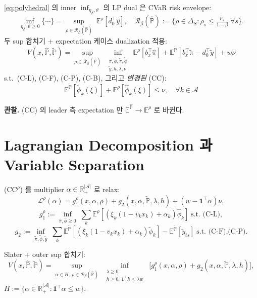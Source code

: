 \documentclass[11pt]{article}
\newcommand{\R}{\mathbb{R}}
\newcommand{\E}{\mathbb{E}}
\newcommand{\cA}{\mathcal{A}}
\newcommand{\Phat}{\hat{\mathbb{P}}}
\newcommand{\Ptil}{\tilde{\mathbb{P}}}
\newcommand{\hatpi}{\hat{\pi}}
\newcommand{\hatphi}{\hat{\phi}}
\newcommand{\tilpi}{\tilde{\pi}}
\newcommand{\tilphi}{\tilde{\phi}}
\newcommand{\hatp}{\hat{p}}
\newcommand{\hatY}{\hat{y}}
\newcommand{\tilY}{\tilde{y}}
\newcommand{\Rb}{\mathcal{R}_\beta}
\theoremstyle{plain}
\theoremstyle{remark}
\begin{document}
\eqref{eq:polyhedral} 의 inner $\inf_{\eta_\beta, \vartheta}$ 의 LP dual 은 CVaR risk envelope:
\begin{equation}\label{eq:risk-envelope}
\inf_{\eta_\beta, \vartheta \geq 0}\{\cdots\} = \sup_{\rho \in \Rb(\Phat)}\;\E^\rho[d_0^\top \hatY],\quad
\Rb(\Phat) := \big\{\rho \in \Delta_S : \rho_s \leq \tfrac{\hatp_s}{1-\beta}\;\forall s\big\}.
\end{equation}
두 sup 합치기 + expectation 케이스 dualization 적용:
\begin{equation}
V(x, \Phat, \Ptil) = \sup_{\rho \in \Rb(\Phat)}\;\inf_{\substack{\hatpi, \hatphi, \tilpi, \tilphi\\ \tilY, h, \lambda, \nu}}\; \E^\rho[b_x^\top \hatpi] + \E^{\Ptil}[b_x^\top \tilpi - d_0^\top \tilY] + w\nu
\end{equation}
s.t.\ (C-L), (C-F), (C-P), (C-B), 그리고 \emph{변경된} (CC):
\begin{equation}
\boxed{\;
\E^{\Ptil}[\tilphi_k(\xi)] + \E^{\rho}[\hatphi_k(\xi)] \leq \nu,\quad \forall k \in \cA
\;}\tag{CC$^\rho$}
\end{equation}

\textbf{관찰.} (CC) 의 leader 측 expectation 만 $\E^{\Phat} \to \E^\rho$ 로 바뀐다.


\section{Lagrangian Decomposition 과 Variable Separation}
\label{sec:lagrangian}

(CC$^\rho$) 를 multiplier $\alpha \in \R^{|\cA|}_+$ 로 relax:
\[
\mathcal{L}^\rho(\alpha) = g_1^\rho(x, \alpha, \rho) + g_2(x, \alpha, \Ptil, \lambda, h) + (w - \mathbf{1}^\top \alpha)\nu,
\]
\[
g_1^\rho := \inf_{\hatpi, \hatphi \geq 0}\;\sum_k \E^\rho[(\xi_k(1-v_kx_k)+\alpha_k)\hatphi_k]\;\text{s.t.\ (C-L)},
\]
\[
g_2 := \inf_{\tilpi, \tilphi, \tilY}\; \sum_k \E^{\Ptil}[(\xi_k(1-v_kx_k)+\alpha_k)\tilphi_k] - \E^{\Ptil}[\tilY_{ts}]\;\text{s.t.\ (C-F),(C-P)}.
\]

Slater + outer sup 합치기:
\begin{equation}\label{eq:lagrangian-form}
V(x, \Phat, \Ptil) = \sup_{\alpha \in H,\,\rho \in \Rb(\Phat)}\; \inf_{\substack{\lambda \geq 0\\ h\geq 0,\,\mathbf{1}^\top h \leq \lambda w}}\; \big[g_1^\rho(x, \alpha, \rho) + g_2(x, \alpha, \Ptil, \lambda, h)\big],
\end{equation}
$H := \{\alpha \in \R_+^{|\cA|} : \mathbf{1}^\top \alpha \leq w\}$.
\end{document}
